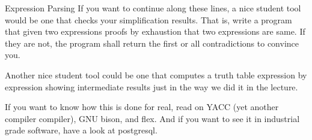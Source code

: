 \begin{task}{Expression Parsing}{}{}
  If you want to continue along these lines, a nice student tool would be one that checks your simplification results. That is, write a program that given two expressions proofs by exhaustion that two expressions are same. If they are not, the program shall return the first or all contradictions to convince you.

  Another nice student tool could be one that computes a truth table expression by expression showing intermediate results just in the way we did it in the lecture.

  If you want to know how this is done for real, read on YACC (yet another compiler compiler), GNU bison, and flex. And if you want to see it in industrial grade software, have a look at postgresql.
\end{task}
